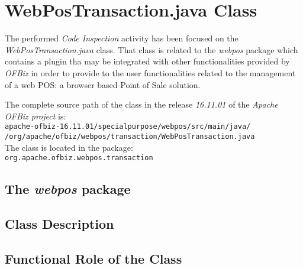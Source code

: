 \section{WebPosTransaction.java Class}
The performed \emph{Code Inspection} activity has been focused on the \emph{WebPosTransaction.java} class. That class is related to the \textit{webpos} package which contains a plugin tha may be integrated with other functionalities provided by \textit{OFBiz} in order to provide to the user functionalities related to the management of a web POS: a browser based Point of Sale solution.

The complete source path of the class in the release \emph{16.11.01} of the \emph{Apache OFBiz project} is:
\\{\tt apache-ofbiz-16.11.01/specialpurpose/webpos/src/main/java/\\/org/apache/ofbiz/webpos/transaction/WebPosTransaction.java}
\\
The class is located in the package:\\
{\tt org.apache.ofbiz.webpos.transaction}

\subsection{The \textit{webpos} package}
\subsection{Class Description}
\subsection{Functional Role of the Class}
